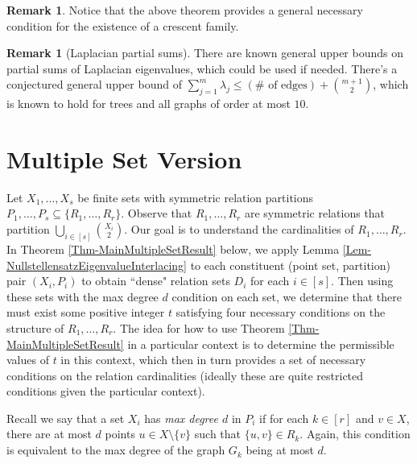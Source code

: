 \documentclass[12pt]{article}
\theoremstyle{definition}
\newtheorem{rem}[thm]{Remark}
\begin{document}
	\begin{rem}
		Notice that the above theorem provides a general necessary condition for the existence of a crescent family.
	\end{rem}
	\fi

	\begin{rem}[Laplacian partial sums]
		There are known general upper bounds on partial sums of Laplacian eigenvalues, which could be used if needed.  There's a conjectured general upper bound of $\sum_{j=1}^m\lambda_j \leq (\#\text{ of edges}) + {m+1 \choose 2}$, which is known to hold for trees and all graphs of order at most $10$.
	\end{rem}
	\section{Multiple Set Version}
	
	Let $X_1,\ldots, X_s$ be finite sets with symmetric relation partitions $P_1, \ldots, P_s \subseteq \{R_1, \ldots, R_r\}$.  Observe that $R_1,\ldots, R_r$ are symmetric relations that partition $\bigcup_{i \in [s]}{X_i \choose 2}$.  Our goal is to understand the cardinalities of $R_1,\ldots, R_r$.  In Theorem \ref{Thm-MainMultipleSetResult} below, we apply Lemma \ref{Lem-NullstellensatzEigenvalueInterlacing} to each constituent (point set, partition) pair $(X_i,P_i)$ to obtain ``dense" relation sets $D_i$ for each $i \in [s]$.  Then using these sets with the max degree $d$ condition on each set, we determine that there must exist some positive integer $t$ satisfying four necessary conditions on the structure of $R_1, \ldots, R_r$.  The idea for how to use Theorem \ref{Thm-MainMultipleSetResult} in a particular context is to determine the permissible values of $t$ in this context, which then in turn provides a set of necessary conditions on the relation cardinalities (ideally these are quite restricted conditions given the particular context).
	
	Recall we say that a set $X_i$ has \emph{max degree $d$} in $P_i$ if for each $k \in [r]$ and $v \in X$, there are at most $d$ points $u\in X \setminus \{v\}$ such that $\{u,v\} \in R_k$.  Again, this condition is equivalent to the max degree of the graph $G_k$ being at most $d$.
	
\end{document}

